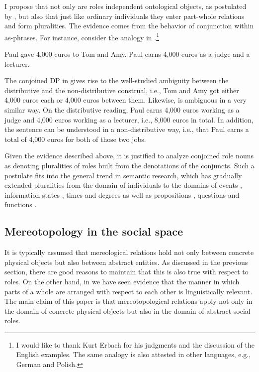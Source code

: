 \documentclass[output=paper]{langscibook}
\begin{document}
I propose that not only are roles independent ontological objects, as postulated by \citet{zobel2017sensitivity}, but also that just like ordinary individuals they enter part-whole relations and form pluralities. The evidence comes from the behavior of conjunction within as-phrases. For instance, consider the analogy in .\footnote{I would like to thank Kurt Erbach for his judgments and the discussion of the English examples. The same analogy is also attested in other languages, e.g., German and Polish.} 

\ea\label{wan:ex:conjunction} \ea Paul gave 4,000 euros to Tom and Amy.\label{wan:ex:conjunction-individuals}
\ex Paul earns 4,000 euros as a judge and a lecturer.\label{wan:ex:conjunction-roles}
\z
\z

\noindent The conjoined DP in  gives rise to the well-studied ambiguity between the distributive and the non-distributive construal, i.e., Tom and Amy got either 4,000 euros each or 4,000 euros between them. Likewise,  is ambiguous in a very similar way. On the distributive reading, Paul earns 4,000 euros working as a judge and 4,000 euros working as a lecturer, i.e., 8,000 euros in total. In addition, the sentence can be understood in a non-distributive way, i.e., that Paul earns a total of 4,000 euros for both of those two jobs.

Given the evidence described above, it is justified to analyze conjoined role nouns as denoting pluralities of roles built from the denotations of the conjuncts. Such a postulate fits into the general trend in semantic research, which has gradually extended pluralities from the domain of individuals to the domains of events \citep{bach1986algebra}, information states \citep{krifka1996parametrized}, times \citep{arstein_francez2003plural} and degrees \citep{dotlacil_nouwen2016comparative} as well as propositions \citep{lahiri2002questions}, questions \citep{beck_sharvit2002pluralities} and functions \citep{schmitt2019pluralities}.

\subsection{Mereotopology in the social space}\label{wan:sec:mereotopology-in-the-social-space}

It is typically assumed that mereological relations hold not only between concrete physical objects but also between abstract entities. As discussed in the previous section, there are good reasons to maintain that this is also true with respect to roles. On the other hand, in  we have seen evidence that the manner in which parts of a whole are arranged with respect to each other is linguistically relevant. The main claim of this paper is that mereotopological relations apply not only in the domain of concrete physical objects but also in the domain of abstract social roles.
\end{document}
